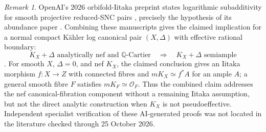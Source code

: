 \documentclass[11pt,reqno]{amsart}
\theoremstyle{definition}
\theoremstyle{remark}
\newtheorem*{remark}{Remark}
\begin{document}
\begin{remark}
OpenAI's 2026 orbifold-Iitaka preprint states logarithmic subadditivity for smooth projective reduced-SNC pairs \cite[\S1]{SIU-OAIIit26}, precisely the hypothesis of its abundance paper \cite[Assumption~1.1]{SIU-OAIAb26}. Combining these manuscripts gives the claimed implication for a normal compact K\"ahler log canonical pair $(X,\Delta)$ with effective rational boundary:
\[
K_X+\Delta\text{ analytically nef and }\mathbb Q\text{-Cartier}
\quad\Longrightarrow\quad K_X+\Delta\text{ semiample}
\]
\cite[Theorem~1.2]{SIU-OAIAb26}. For smooth $X$, $\Delta=0$, and nef $K_X$, the claimed conclusion gives an Iitaka morphism $f:X\to Z$ with connected fibres and $mK_X\simeq f^*A$ for an ample $A$; a general smooth fibre $F$ satisfies $mK_F\simeq\mathcal O_F$. Thus the combined claim addresses the nef canonical-fibration component without a remaining Iitaka assumption, but not the direct analytic construction when $K_X$ is not pseudoeffective. Independent specialist verification of these AI-generated proofs was not located in the literature checked through 25 October 2026.
\end{remark}
\end{document}
